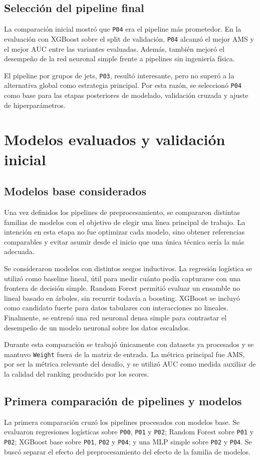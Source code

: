 \documentclass{article}
\begin{document}
\subsection{Selección del pipeline final}
La comparación inicial mostró que \texttt{P04} era el pipeline más prometedor. En la evaluación con XGBoost sobre el split de validación, \texttt{P04} alcanzó el mejor AMS y el mejor AUC entre las variantes evaluadas. Además, también mejoró el desempeño de la red neuronal simple frente a pipelines sin ingeniería física.

El pipeline por grupos de jets, \texttt{P03}, resultó interesante, pero no superó a la alternativa global como estrategia principal. Por esta razón, se seleccionó \texttt{P04} como base para las etapas posteriores de modelado, validación cruzada y ajuste de hiperparámetros.

\section{Modelos evaluados y validación inicial}
\subsection{Modelos base considerados}
Una vez definidos los pipelines de preprocesamiento, se compararon distintas familias de modelos con el objetivo de elegir una línea principal de trabajo. La intención en esta etapa no fue optimizar cada modelo, sino obtener referencias comparables y evitar asumir desde el inicio que una única técnica sería la más adecuada.

Se consideraron modelos con distintos sesgos inductivos. La regresión logística se utilizó como baseline lineal, útil para medir cuánto podía capturarse con una frontera de decisión simple. Random Forest permitió evaluar un ensamble no lineal basado en árboles, sin recurrir todavía a boosting. XGBoost se incluyó como candidato fuerte para datos tabulares con interacciones no lineales. Finalmente, se entrenó una red neuronal densa simple para contrastar el desempeño de un modelo neuronal sobre los datos escalados.

Durante esta comparación se trabajó únicamente con datasets ya procesados y se mantuvo \texttt{Weight} fuera de la matriz de entrada. La métrica principal fue AMS, por ser la métrica relevante del desafío, y se utilizó AUC como medida auxiliar de la calidad del ranking producido por los scores.

\subsection{Primera comparación de pipelines y modelos}
La primera comparación cruzó los pipelines procesados con modelos base. Se evaluaron regresiones logísticas sobre \texttt{P00}, \texttt{P01} y \texttt{P02}; Random Forest sobre \texttt{P01} y \texttt{P02}; XGBoost base sobre \texttt{P01}, \texttt{P02} y \texttt{P04}; y una MLP simple sobre \texttt{P02} y \texttt{P04}. Se buscó separar el efecto del preprocesamiento del efecto de la familia de modelos.
\end{document}
